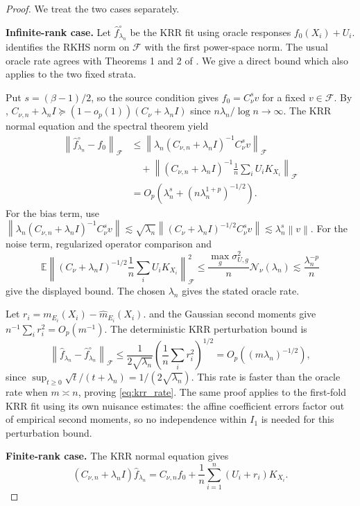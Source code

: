 \documentclass[11pt]{article}
\newcommand{\E}{\mathbb{E}}
\newcommand{\F}{\mathcal{F}}
\newcommand{\Ncal}{\mathcal{N}}
\newcommand{\norm}[1]{\left\lVert #1\right\rVert}
\begin{document}
\begin{proof}
We treat the two cases separately.

\medskip
\noindent\textbf{Infinite-rank case.}
Let $\widehat f_{\lambda_n}^{\circ}$ be the KRR fit using oracle responses $f_0(X_i)+U_i$.  identifies the RKHS norm on $\F$ with the first power-space norm. The usual oracle rate agrees with Theorems 1 and 2 of \citet{fischer2020sobolev}. We give a direct bound which also applies to the two fixed strata.

Put $s=(\beta-1)/2$, so the source condition gives $f_0=C_\nu^sv$ for a fixed $v\in\F$. By , $C_{\nu,n}+\lambda_n I\succeq(1-o_p(1))(C_\nu+\lambda_n I)$ since $n\lambda_n/\log n\to\infty$. The KRR normal equation and the spectral theorem yield
\begin{align*}
 \norm{\widehat f_{\lambda_n}^{\circ}-f_0}_{\F}
 &\leq\norm{\lambda_n(C_{\nu,n}+\lambda_n I)^{-1}C_\nu^sv}_{\F}\\
 &\quad+\norm{(C_{\nu,n}+\lambda_n I)^{-1}\frac1n\sum_iU_iK_{X_i}}_{\F}\\
 &=O_p\!\left(\lambda_n^s+(n\lambda_n^{1+p})^{-1/2}\right).
\end{align*}
For the bias term, use $\norm{\lambda_n(C_{\nu,n}+\lambda_n I)^{-1}C_\nu^sv}\lesssim\sqrt{\lambda_n}\norm{(C_\nu+\lambda_n I)^{-1/2}C_\nu^sv}\lesssim\lambda_n^s\norm v$. For the noise term, regularized operator comparison and
\[
 \E\left\|(C_\nu+\lambda_n I)^{-1/2}\frac1n\sum_iU_iK_{X_i}\right\|_{\F}^2
 \leq\frac{\max_g\sigma_{U,g}^2}{n}\Ncal_\nu(\lambda_n)
 \lesssim\frac{\lambda_n^{-p}}n
\]
give the displayed bound. The chosen $\lambda_n$ gives the stated oracle rate.

Let $r_i=m_{E_i}(X_i)-\widehat m_{E_i}(X_i)$.  and the Gaussian second moments give $n^{-1}\sum_i r_i^2=O_p(m^{-1})$. The deterministic KRR perturbation bound is
\[
 \norm{\widehat f_{\lambda_n}-\widehat f_{\lambda_n}^{\circ}}_{\F}
 \leq\frac1{2\sqrt{\lambda_n}}\left(\frac1n\sum_i r_i^2\right)^{1/2}
 =O_p((m\lambda_n)^{-1/2}),
\]
since $\sup_{t\geq0}\sqrt t/(t+\lambda_n)=1/(2\sqrt{\lambda_n})$. This rate is faster than the oracle rate when $m\asymp n$, proving \eqref{eq:krr_rate}. The same proof applies to the first-fold KRR fit using its own nuisance estimates: the affine coefficient errors factor out of empirical second moments, so no independence within $I_1$ is needed for this perturbation bound.

\medskip
\noindent\textbf{Finite-rank case.}
The KRR normal equation gives
\[
  (C_{\nu,n}+\lambda_n I)\widehat f_{\lambda_n}
  =
  C_{\nu,n}f_0+\frac1n\sum_{i=1}^n(U_i+r_i)K_{X_i}.
\]


\end{proof}
\end{document}
